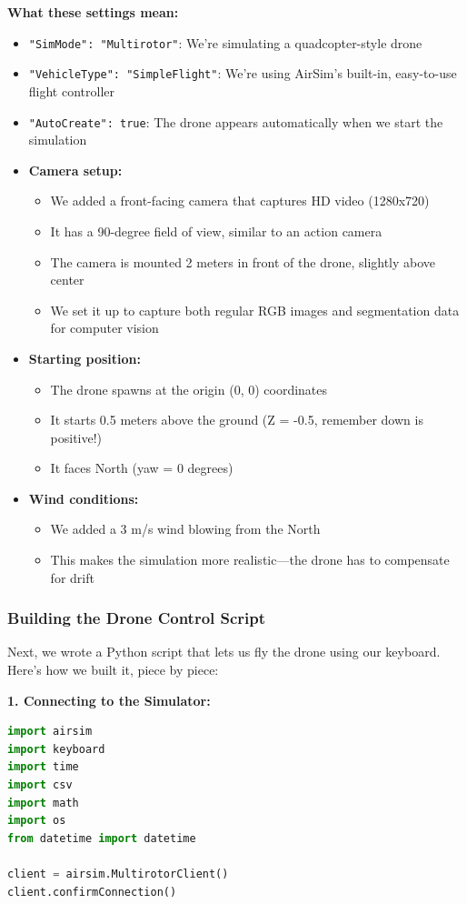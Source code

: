 \textbf{What these settings mean:}
\begin{itemize}
	\item \texttt{"SimMode": "Multirotor"}: We're simulating a quadcopter-style drone
	\item \texttt{"VehicleType": "SimpleFlight"}: We're using AirSim's built-in, easy-to-use flight controller
	\item \texttt{"AutoCreate": true}: The drone appears automatically when we start the simulation
	\item \textbf{Camera setup:}
	\begin{itemize}
		\item We added a front-facing camera that captures HD video (1280x720)
		\item It has a 90-degree field of view, similar to an action camera
		\item The camera is mounted 2 meters in front of the drone, slightly above center
		\item We set it up to capture both regular RGB images and segmentation data for computer vision
	\end{itemize}
	\item \textbf{Starting position:}
	\begin{itemize}
		\item The drone spawns at the origin (0, 0) coordinates
		\item It starts 0.5 meters above the ground (Z = -0.5, remember down is positive!)
		\item It faces North (yaw = 0 degrees)
	\end{itemize}
	\item \textbf{Wind conditions:}
	\begin{itemize}
		\item We added a 3 m/s wind blowing from the North
		\item This makes the simulation more realistic—the drone has to compensate for drift
	\end{itemize}
\end{itemize}

\subsubsection{Building the Drone Control Script}

Next, we wrote a Python script that lets us fly the drone using our keyboard. Here's how we built it, piece by piece:

\textbf{1. Connecting to the Simulator:}
\begin{lstlisting}[language=Python]
import airsim
import keyboard
import time 
import csv
import math 
import os
from datetime import datetime

client = airsim.MultirotorClient()
client.confirmConnection()
\end{lstlisting}

